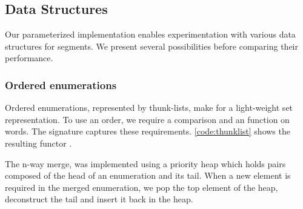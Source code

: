 

\subsection{Data Structures}

Our parameterized implementation enables experimentation with various
data structures for segments. We present several possibilities before
comparing their performance.

\subsubsection{Ordered enumerations}

Ordered enumerations, represented by thunk-lists, make
for a light-weight set representation.
To use an order, we require a comparison and an
 function on words.  The  signature
captures these requirements. \autoref{code:thunklist} shows the
resulting functor .



The n-way merge, 
was implemented using a priority heap which holds pairs composed
of the head of an enumeration and its tail. When a new element is required in the
merged enumeration, we pop the top element of the heap, deconstruct
the tail and insert it back in the heap.

